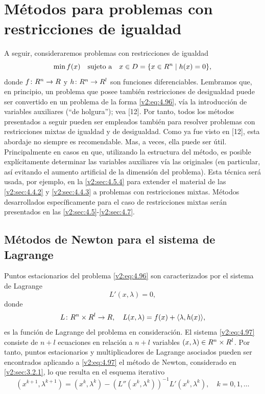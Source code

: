 
\section{Métodos para problemas con restricciones de igualdad}\label{v2:sec:4.4}

A seguir, consideraremos problemas con restricciones de igualdad
\begin{equation}
    \min f(x) \quad \text{sujeto a} \quad x \in D = \{x \in R^n \mid h(x) = 0\},
    \label{v2:eq:4.96}
\end{equation}
donde $f \colon R^n \to R$ y $h \colon R^n \to R^l$ son funciones diferenciables. Lembramos que, en principio, un problema que posee también restricciones de desigualdad puede ser convertido en un problema de la forma \eqref{v2:eq:4.96}, vía la introducción de variables auxiliares (``de holgura''); vea [12]. Por tanto, todos los métodos presentados a seguir pueden ser empleados también para resolver problemas con restricciones mixtas de igualdad y de desigualdad. Como ya fue visto en [12], esta abordaje no siempre es recomendable. Mas, a veces, ella puede ser útil. Principalmente en casos en que, utilizando la estructura del método, es posible explícitamente determinar las variables auxiliares vía las originales (en particular, así evitando el aumento artificial de la dimensión del problema). Esta técnica será usada, por ejemplo, en la \cref{v2:sec:4.5.4} para extender el material de las \cref{v2:sec:4.4.2} y \cref{v2:sec:4.4.3} a problemas con restricciones mixtas. Métodos desarrollados específicamente para el caso de restricciones mixtas serán presentados en las \cref{v2:sec:4.5}-\cref{v2:sec:4.7}.

\subsection{Métodos de Newton para el sistema de Lagrange}\label{v2:sec:4.4.1}

Puntos estacionarios del problema \eqref{v2:eq:4.96} son caracterizados por el sistema de Lagrange
\begin{equation}
    L'(x, \lambda) = 0,
    \label{v2:eq:4.97}
\end{equation}
donde
\[
    L \colon R^n \times R^l \to R, \quad L(x, \lambda) = f(x) + \langle \lambda, h(x) \rangle,
\]
es la función de Lagrange del problema en consideración. El sistema \eqref{v2:eq:4.97} consiste de $n + l$ ecuaciones en relación a $n + l$ variables $(x, \lambda) \in R^n \times R^l$. Por tanto, puntos estacionarios y multiplicadores de Lagrange asociados pueden ser encontrados aplicando a \eqref{v2:eq:4.97} el método de Newton, considerado en \cref{v2:sec:3.2.1}, lo que resulta en el esquema iterativo
\[
    (x^{k+1}, \lambda^{k+1}) = (x^k, \lambda^k) - (L''(x^k, \lambda^k))^{-1} L'(x^k, \lambda^k), \quad k = 0, 1, \dots
\]

